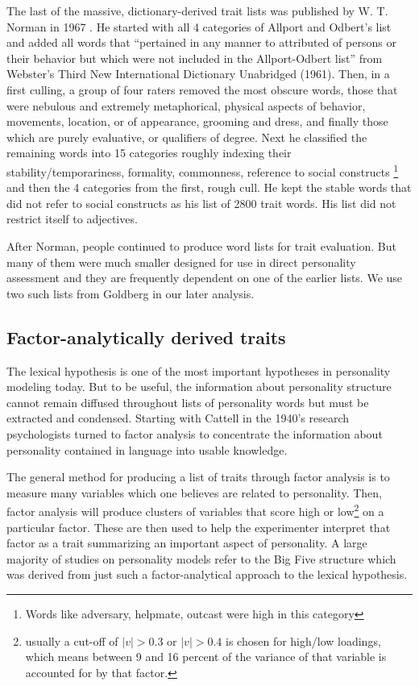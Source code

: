 The last of the massive, dictionary-derived trait lists was published by W. T. 
Norman in 1967 \citep{Norman1967}. He started with all 4 categories of
Allport and Odbert's list and added all words that ``pertained in any
manner to attributed of persons or their behavior but which were not included 
in the Allport-Odbert list'' from Webster's Third New International Dictionary
Unabridged (1961). Then, in a first culling, a group of four raters removed 
the most obscure words, 
those that were
nebulous and extremely metaphorical, physical aspects of behavior, movements,
location, or of appearance, grooming and dress, and finally those which are
purely evaluative, or qualifiers of degree. Next he
classified the remaining words into 15 categories roughly indexing their
stability/temporariness, formality, commonness, reference to social constructs
\footnote{Words like adversary, helpmate, outcast were high in this category}
and then the 4 categories from the first, rough cull. He kept the stable words
that did not refer to social constructs as his list of 2800 trait words. His
list did not restrict itself to adjectives.

After Norman, people continued to produce word lists for trait evaluation. But
many of them were much smaller \textendash designed for use in direct personality 
assessment and they are frequently dependent on one of the earlier lists. We
use two such lists from Goldberg in our later analysis. 
\citep{Saucier1996,Goldberg1990} 

\subsection{Factor-analytically derived traits}

The lexical hypothesis is one of the most important hypotheses in personality
modeling today. But to be useful, the information about personality structure
cannot remain diffused throughout lists of personality words but must be 
extracted and condensed. Starting with Cattell in the 1940's 
\citep[e.g.][]{Cattell1946,Cattell1948} research psychologists turned to factor analysis to 
concentrate the information about personality contained in language into usable
knowledge.

The general method for producing a list of traits through factor analysis is to
measure many variables which one believes are related to personality. Then,
factor analysis will produce clusters of variables that score high or 
low\footnote{usually a cut-off of 
$\left|v\right| > 0.3$ or $\left|v\right| > 0.4$
is chosen for high/low loadings, which means between 9 and 16 percent of the
variance of that variable is accounted for by that factor.} on
a particular factor. These are then used to help the experimenter interpret
that factor as a trait summarizing an important aspect of personality. 
A large majority of studies on personality models 
refer to the Big Five structure \citep[p. 127]{DeRaad2009} which was
derived from just such a factor-analytical approach to the lexical hypothesis.


